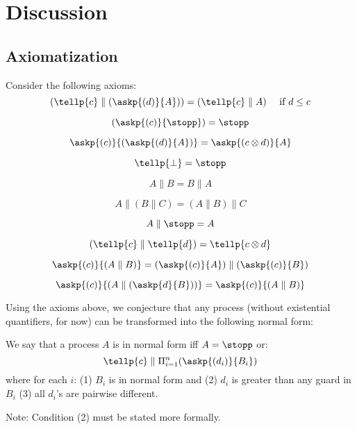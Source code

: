 \documentclass[festschrift13.tex]{subfiles}
\begin{document}
\section{Discussion}

\subsection{Axiomatization}

Consider the following axioms:
\begin{equation} \label{eq:MP}
(\tellp{c} \parallel (\askp{(d)}{A})) = (\tellp{c} \parallel A) \mbox{\ \ \ \ if } d \leq c
\end{equation}

\begin{equation}
(\askp{(c)}{\stopp}) = \stopp
\end{equation}

\begin{equation}
\askp{(c)}{(\askp{(d)}{A})} = \askp{(c \otimes d)}{A}
\end{equation}

\begin{equation}
\tellp{\bot} = \stopp
\end{equation}

\begin{equation}
A \parallel B = B \parallel A
\end{equation}

\begin{equation}
A \parallel (B \parallel C) = (A \parallel B) \parallel C
\end{equation}

\begin{equation}
A \parallel \stopp = A
\end{equation}

\begin{equation}
(\tellp{c} \parallel \tellp{d}) =  \tellp{c \otimes d}
\end{equation}

\begin{equation}
\askp{(c)}{(A \parallel B)} = (\askp{(c)}{A}) \parallel (\askp{(c)}{B})
\end{equation}

\begin{equation}
\askp{(c)}{(A \parallel (\askp{d}{B}))} = \askp{(c)}{(A \parallel B)}
\end{equation}

Using the axioms above, we conjecture that any process (without existential quantifiers, for now) can be
transformed into the following normal form:
\begin{definition}
We say that a process $A$ is in normal form iff $A = \stopp$ or:
\[ \tellp{c} \parallel \Pi_{i=1}^n (\askp{(d_i)}{B_i}) \]
where for each $i$: (1) $B_i$ is in normal form and (2) $d_i$ is greater than any guard in $B_i$
(3) all $d_i$'s are pairwise different.
\end{definition}
Note: Condition (2) must be stated more formally. \\
\end{document}
